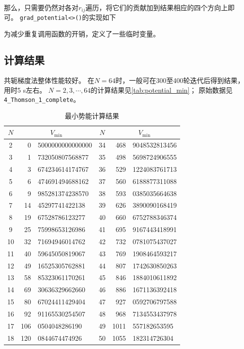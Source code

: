 那么，只需要仍然对各对$r_{ij}$遍历，将它们的贡献加到结果相应的四个方向上即可。
\texttt{grad\_potential<>()}的实现如下
{
    \linespread{1.0}
    
}
为减少重复调用函数的开销，定义了一些临时变量。

\subsection{计算结果}
共轭梯度法整体性能较好。
在$N=64$时，一般可在300至400轮迭代后得到结果，用时5 s左右。
$N=2, 3, \cdots, 64$的计算结果见\autoref{tab:potential_min}；
原始数据见\texttt{4\_Thomson\_1\_complete}。

\begin{table}
\centering
\caption{最小势能计算结果}
\label{tab:potential_min}
\begin{tabular}{cr@{.}l|cr@{.}l}
\toprule
$N$ & \multicolumn{2}{c|}{$V_\text{min}$} & $N$ & \multicolumn{2}{c}{$V_\text{min}$} \\ \midrule
2 & 0&5000000000000000 & 34 & 468&9048532813456 \\
3 & 1&732050807568877 & 35 & 498&5698724906555 \\
4 & 3&674234614174767 & 36 & 529&1224083761713 \\
5 & 6&474691494688162 & 37 & 560&6188877311088 \\
6 & 9&985281374238570 & 38 & 593&0385035664638 \\
7 & 14&45297741422138 & 39 & 626&3890090168419 \\
8 & 19&67528786123277 & 40 & 660&6752788346374 \\
9 & 25&75998653126986 & 41 & 695&9167443418991 \\
10 & 32&71694946014762 & 42 & 732&0781075437027 \\
11 & 40&59645050819067 & 43 & 769&1908464593217 \\
12 & 49&16525305762881 & 44 & 807&1742630850263 \\
13 & 58&85323061170261 & 45 & 846&1884010611892 \\
14 & 69&30636329662660 & 46 & 886&1671136392418 \\
15 & 80&67024411429404 & 47 & 927&0592706797588 \\
16 & 92&91165530254507 & 48 & 968&7134553437978 \\
17 & 106&0504048286190 & 49 & 1011&557182653595 \\
18 & 120&0844674474926 & 50 & 1055&182314726304 \\

\end{tabular}
\end{table}
